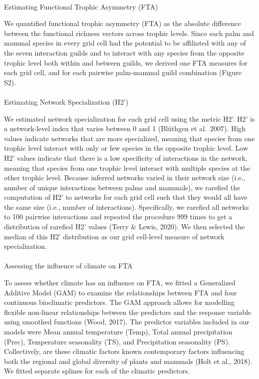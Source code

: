 \documentclass[
]{agujournal2019}
\makeatletter
\let\oldparagraph\paragraph
\renewcommand{\paragraph}{
    \@ifstar
      \xxxParagraphStar
      \xxxParagraphNoStar
  }
\newcommand{\xxxParagraphStar}[1]{\oldparagraph*{#1}\mbox{}}
\newcommand{\xxxParagraphNoStar}[1]{\oldparagraph{#1}\mbox{}}
\makeatother
\begin{document}
\paragraph{Estimating Functional Trophic Asymmetry
(FTA)}\label{estimating-functional-trophic-asymmetry-fta}

We quantified functional trophic asymmetry (FTA) as the absolute
difference between the functional richness vectors across trophic
levels. Since each palm and mammal species in every grid cell had the
potential to be affiliated with any of the seven interaction guilds and
to interact with any species from the opposite trophic level both within
and between guilds, we derived one FTA measures for each grid cell, and
for each pairwise palm-mammal guild combination (Figure S2).

\paragraph{Estimating Network Specialization
(H2')}\label{estimating-network-specialization-h2}

We estimated network specialization for each grid cell using the metric
H2'. H2' is a network-level index that varies between 0 and 1 (Blüthgen
et al.~2007). High values indicate networks that are more specialized,
meaning that species from one trophic level interact with only or few
species in the opposite trophic level. Low H2' values indicate that
there is a low specificity of interactions in the network, meaning that
species from one trophic level interact with multiple species at the
other trophic level. Because inferred networks varied in their network
size (i.e., number of unique interactions between palms and mammals), we
rarefied the computation of H2' to networks for each grid cell such that
they would all have the same size (i.e., number of interactions).
Specifically, we rarefied all networks to 100 pairwise interactions and
repeated the procedure 999 times to get a distribution of rarefied H2'
values (Terry \& Lewis, 2020). We then selected the median of this H2'
distribution as our grid cell-level measure of network specialization.

\paragraph{Assessing the influence of climate on
FTA}\label{assessing-the-influence-of-climate-on-fta}

To assess whether climate has an influence on FTA, we fitted a
Generalized Additive Model (GAM) to examine the relationships between
FTA and four continuous bioclimatic predictors. The GAM approach allows
for modelling flexible non-linear relationships between the predictors
and the response variable using smoothed functions (Wood, 2017). The
predictor variables included in our models were Mean annual temperature
(Temp), Total annual precipitation (Prec), Temperature seasonality (TS),
and Precipitation seasonality (PS). Collectively, are these climatic
factors known contemporary factors influencing both the regional and
global diversity of plants and mammals (Holt et al., 2018). We fitted
separate splines for each of the climatic predictors.
\end{document}
